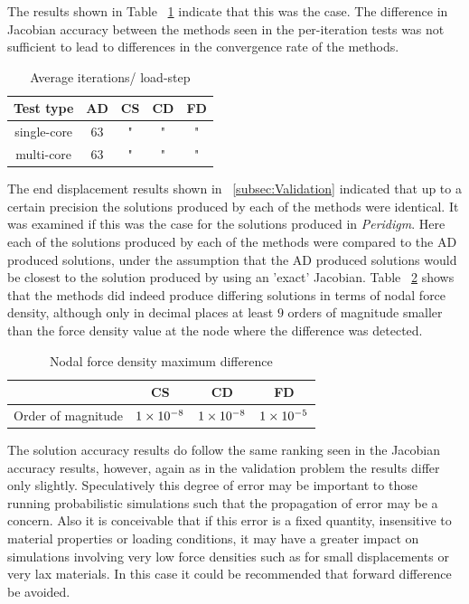 \documentclass[preprint,12pt]{elsarticle}
\begin{document}
The results shown in Table ~\ref{tab:ConvergenceStudy2} indicate that this was the case. 
The difference in Jacobian accuracy between the methods seen in the per-iteration tests
was not sufficient to lead to differences in the convergence rate of the methods.

\begin{table}[!ht]   
    \centering \caption{Average iterations/ load-step} 
    \label{tab:ConvergenceStudy2}   
    \begin{tabular}{c c c c c}
    \toprule Test type & AD & CS & CD & FD\\
        \midrule 
        single-core & 63 & " & " & "\\ 
        multi-core  & 63 & " & " & "\\ 
\bottomrule \end{tabular} \end{table}

The end displacement results shown in ~\ref{subsec:Validation} indicated that up to a certain precision the
solutions produced by each of the methods were identical. It was examined if this was the case for the 
solutions produced in \emph{Peridigm}. Here each of the solutions produced by each of the 
methods were compared to the AD produced solutions, under the assumption that the AD produced solutions
would be closest to the solution produced by using an 'exact' Jacobian. Table ~\ref{tab:PeridigmSolutionAccuracy} shows that the methods
did indeed produce differing solutions in terms of nodal force density, although only in decimal places at least $9$ orders 
of magnitude smaller than the force density value at the node where the difference was detected.

\begin{table}[!ht]   
    \centering \caption{Nodal force density maximum difference} 
    \label{tab:PeridigmSolutionAccuracy}   
    \begin{tabular}{c c c c}
    \toprule  & CS & CD & FD\\
        \midrule  Order of magnitude & $\num{1.E-8}$ & $\num{1.E-8}$ & $\num{1.E-5}$ \\ 
\bottomrule \end{tabular} \end{table}

The solution accuracy results do follow the same ranking seen in the Jacobian accuracy results, however,
again as in the validation problem the results differ only slightly. Speculatively this degree of error
may be important to those running probabilistic simulations such that the propagation of error may be 
a concern. Also it is conceivable that if this error is a fixed quantity, insensitive to material 
properties or loading conditions, it may have a greater impact on simulations involving very low
force densities such as for small displacements or very lax materials. In this case it could be recommended
that forward difference be avoided. 
\end{document}
